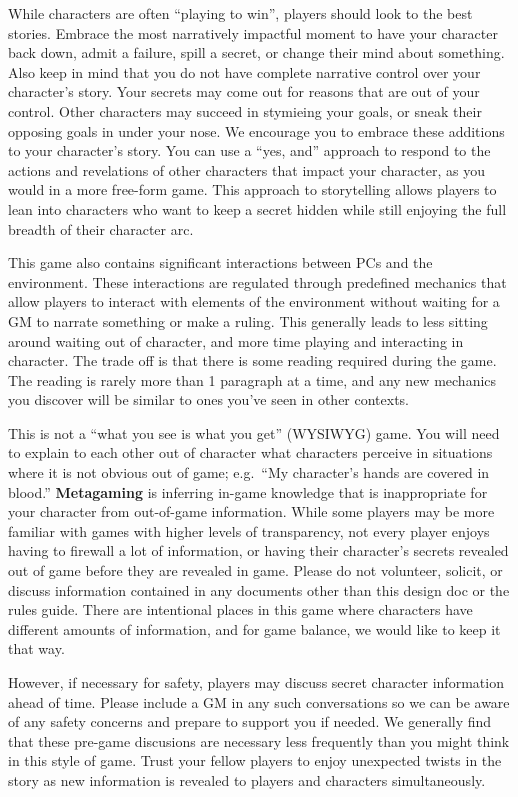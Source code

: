 \documentclass[sheet]{GL2020}
\begin{document}
While characters are often ``playing to win'', players should look to the best stories. Embrace the most narratively impactful moment to have your character back down, admit a failure, spill a secret, or change their mind about something. Also keep in mind that you do not have complete narrative control over your character's story. Your secrets may come out for reasons that are out of your control. Other characters may succeed in stymieing your goals, or sneak their opposing goals in under your nose. We encourage you to embrace these additions to your character's story. You can use a ``yes, and'' approach to respond to the actions and revelations of other characters that impact your character, as you would in a more free-form game. This approach to storytelling allows players to lean into characters who want to keep a secret hidden while still enjoying the full breadth of their character arc.

This game also contains significant interactions between PCs and the environment. These interactions are regulated through predefined mechanics that allow players to interact with elements of the environment without waiting for a GM to narrate something or make a ruling. This generally leads to less sitting around waiting out of character, and more time playing and interacting in character. The trade off is that there is some reading required during the game. The reading is rarely more than 1 paragraph at a time, and any new mechanics you discover will be similar to ones you've seen in other contexts.

This is not a ``what you see is what you get'' (WYSIWYG) game. You will need to explain to each other out of character what characters perceive in situations where it is not obvious out of game; e.g.\ ``My character's hands are covered in blood.'' {\bf Metagaming} is inferring in-game knowledge that is inappropriate for your character from out-of-game information. While some players may be more familiar with games with higher levels of transparency, not every player enjoys having to firewall a lot of information, or having their character's secrets revealed out of game before they are revealed in game. Please do not volunteer, solicit, or discuss information contained in any documents other than this design doc or the rules guide. There are intentional places in this game where characters have different amounts of information, and for game balance, we would like to keep it that way. 

However, if necessary for safety, players may discuss secret character information ahead of time. Please include a GM in any such conversations so we can be aware of any safety concerns and prepare to support you if needed. We generally find that these pre-game discusions are necessary less frequently than you might think in this style of game. Trust your fellow players to enjoy unexpected twists in the story as new information is revealed to players and characters simultaneously.
\end{document}
